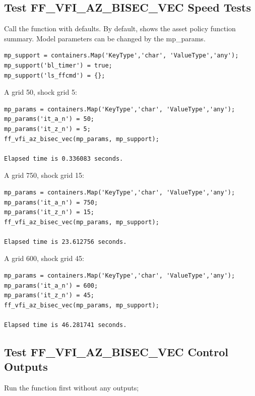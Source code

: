 \documentclass[
]{book}
\begin{document}
\hypertarget{test-ff_vfi_az_bisec_vec-speed-tests-1}{%
\subsection{Test FF\_VFI\_AZ\_BISEC\_VEC Speed Tests}\label{test-ff_vfi_az_bisec_vec-speed-tests-1}}

Call the function with defaults. By default, shows the asset policy
function summary. Model parameters can be changed by the mp\_params.

\begin{verbatim}
mp_support = containers.Map('KeyType','char', 'ValueType','any');
mp_support('bl_timer') = true;
mp_support('ls_ffcmd') = {};
\end{verbatim}

A grid 50, shock grid 5:

\begin{verbatim}
mp_params = containers.Map('KeyType','char', 'ValueType','any');
mp_params('it_a_n') = 50;
mp_params('it_z_n') = 5;
ff_vfi_az_bisec_vec(mp_params, mp_support);

Elapsed time is 0.336083 seconds.
\end{verbatim}

A grid 750, shock grid 15:

\begin{verbatim}
mp_params = containers.Map('KeyType','char', 'ValueType','any');
mp_params('it_a_n') = 750;
mp_params('it_z_n') = 15;
ff_vfi_az_bisec_vec(mp_params, mp_support);

Elapsed time is 23.612756 seconds.
\end{verbatim}

A grid 600, shock grid 45:

\begin{verbatim}
mp_params = containers.Map('KeyType','char', 'ValueType','any');
mp_params('it_a_n') = 600;
mp_params('it_z_n') = 45;
ff_vfi_az_bisec_vec(mp_params, mp_support);

Elapsed time is 46.281741 seconds.
\end{verbatim}

\hypertarget{test-ff_vfi_az_bisec_vec-control-outputs}{%
\subsection{Test FF\_VFI\_AZ\_BISEC\_VEC Control Outputs}\label{test-ff_vfi_az_bisec_vec-control-outputs}}

Run the function first without any outputs;
\end{document}
